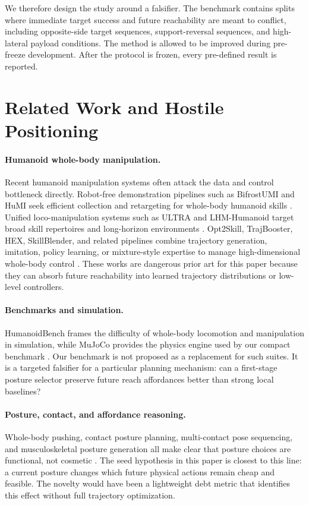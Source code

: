 \documentclass{article}
\begin{document}
We therefore design the study around a falsifier. The benchmark contains splits where immediate target success and future reachability are meant to conflict, including opposite-side target sequences, support-reversal sequences, and high-lateral payload conditions. The method is allowed to be improved during pre-freeze development. After the protocol is frozen, every pre-defined result is reported.

\section{Related Work and Hostile Positioning}

\paragraph{Humanoid whole-body manipulation.}
Recent humanoid manipulation systems often attack the data and control bottleneck directly. Robot-free demonstration pipelines such as BifrostUMI and HuMI seek efficient collection and retargeting for whole-body humanoid skills \citep{prior1,prior3}. Unified loco-manipulation systems such as ULTRA and LHM-Humanoid target broad skill repertoires and long-horizon environments \citep{prior4,prior5}. Opt2Skill, TrajBooster, HEX, SkillBlender, and related pipelines combine trajectory generation, imitation, policy learning, or mixture-style expertise to manage high-dimensional whole-body control \citep{prior7,prior8,prior12}. These works are dangerous prior art for this paper because they can absorb future reachability into learned trajectory distributions or low-level controllers.

\paragraph{Benchmarks and simulation.}
HumanoidBench frames the difficulty of whole-body locomotion and manipulation in simulation, while MuJoCo provides the physics engine used by our compact benchmark \citep{prior14,mujoco}. Our benchmark is not proposed as a replacement for such suites. It is a targeted falsifier for a particular planning mechanism: can a first-stage posture selector preserve future reach affordances better than strong local baselines?

\paragraph{Posture, contact, and affordance reasoning.}
Whole-body pushing, contact posture planning, multi-contact pose sequencing, and musculoskeletal posture generation all make clear that posture choices are functional, not cosmetic \citep{prior2,prior13,prior15}. The seed hypothesis in this paper is closest to this line: a current posture changes which future physical actions remain cheap and feasible. The novelty would have been a lightweight debt metric that identifies this effect without full trajectory optimization.
\end{document}
